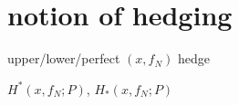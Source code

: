 \section{notion of hedging}
upper/lower/perfect $ (x,f_N) $ hedge

$ H^*(x,f_N;P) $, $H_*(x,f_N;P) $








